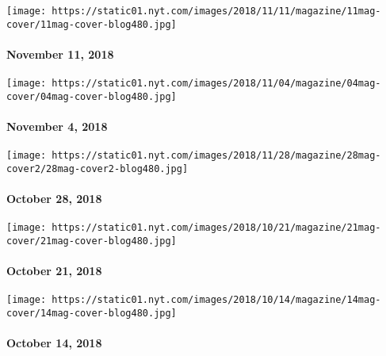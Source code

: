 \href{https://www.nytimes.com/issue/magazine/2018/11/16/The-111118-issue}{}

\texttt{[image: https://static01.nyt.com/images/2018/11/11/magazine/11mag-cover/11mag-cover-blog480.jpg]}

\hypertarget{november-11-2018}{%
\paragraph{November 11, 2018}\label{november-11-2018}}

\href{https://www.nytimes.com/issue/magazine/2018/11/02/the-11042018-issue}{}

\texttt{[image: https://static01.nyt.com/images/2018/11/04/magazine/04mag-cover/04mag-cover-blog480.jpg]}

\hypertarget{november-4-2018}{%
\paragraph{November 4, 2018}\label{november-4-2018}}

\href{https://www.nytimes.com/issue/magazine/2018/10/26/the-102818-issue}{}

\texttt{[image: https://static01.nyt.com/images/2018/11/28/magazine/28mag-cover2/28mag-cover2-blog480.jpg]}

\hypertarget{october-28-2018}{%
\paragraph{October 28, 2018}\label{october-28-2018}}

\href{https://www.nytimes.com/issue/magazine/2018/10/19/the-102118-issue}{}

\texttt{[image: https://static01.nyt.com/images/2018/10/21/magazine/21mag-cover/21mag-cover-blog480.jpg]}

\hypertarget{october-21-2018}{%
\paragraph{October 21, 2018}\label{october-21-2018}}

\href{https://www.nytimes.com/issue/magazine/2018/10/12/the-101418-issue}{}

\texttt{[image: https://static01.nyt.com/images/2018/10/14/magazine/14mag-cover/14mag-cover-blog480.jpg]}

\hypertarget{october-14-2018}{%
\paragraph{October 14, 2018}\label{october-14-2018}}


